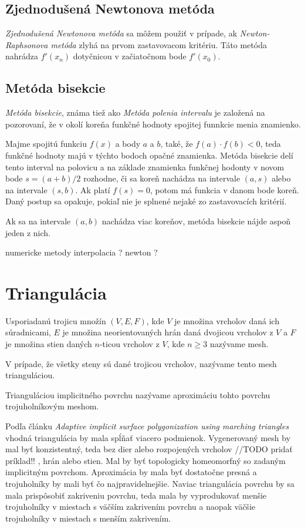 \subsection{Zjednodušená Newtonova metóda}

\textit{Zjednodušená Newtonova metóda} sa môžem použiť v prípade, ak \textit{Newton-Raphsonova metóda} zlyhá na prvom 
zastavovacom kritériu. Táto metóda nahrádza $f'(x_n)$ dotyčnicou v začiatočnom bode $f'(x_0)$.  

\subsection{Metóda bisekcie}

\textit{Metóda bisekcie}, známa tiež ako \textit{Metóda polenia intervalu} je založená na pozorovaní, že v okolí koreňa 
funkčné hodnoty spojitej funnkcie menia znamienko. 

Majme spojitú funkciu $f(x)$ a body $a$ a $b$, také, že $f(a) \cdot f(b) < 0$, teda funkčné hodnoty majú v týchto bodoch 
opačné znamienka. Metóda bisekcie delí tento interval na polovicu a na základe znamienka funkčnej hodonty v novom bode $s = (a+b)/2$
rozhodne, či sa koreň nachádza na intervale $(a, s)$ alebo na intervale $(s, b)$. Ak platí $f(s) = 0$, potom má funkcia v danom bode 
koreň. Daný postup sa opakuje, pokiaľ nie je splnené nejaké zo zastavovacích kritérií.

Ak sa na intervale $(a, b)$ nachádza viac koreňov, metóda bisekcie nájde aspoň jeden z nich.


numericke metody
interpolacia ?
newton ?

\newpage
\section{Triangulácia}

Usporiadanú trojicu množín $(V, E, F)$, kde $V$ je množina vrcholov daná ich súradnicami, 
$E$ je množina neorientovaných hrán daná 
dvojicou vrcholov z $V$ a $F$ je množina stien daných $n$-ticou vrcholov z $V$, kde $n \geq 3$ 
nazývame mesh.

V prípade, že všetky steny sú dané trojicou vrcholov, nazývame tento mesh trianguláciou.

Trianguláciou implicitného povrchu nazývame aproximáciu tohto povrchu trojuholníkovým meshom.

Podľa článku \textit{Adaptive implicit surface polygonization using marching triangles} \cite{akkouche2001adaptive}
vhodná triangulácia by mala spĺňať viacero podmienok. Vygenerovaný mesh by mal byť konzistentný, 
teda bez dier alebo rozpojených vrcholov //TODO pridať príklad!! , hrán alebo stien. Mal by byť topologicky homeomorfný 
so zadaným implicitným povrchom. Aproximácia by mala byť dostatočne presná a trojuholníky by mali 
byť čo najpravidelnejšie. Naviac triangulácia povrchu by sa mala prispôsobiť zakriveniu povrchu,
teda mala by vyprodukovať menšie trojuholníky v miestach s väčším zakrivením povrchu a naopak väčšie
trojuholníky v miestach s menším zakrivením.

